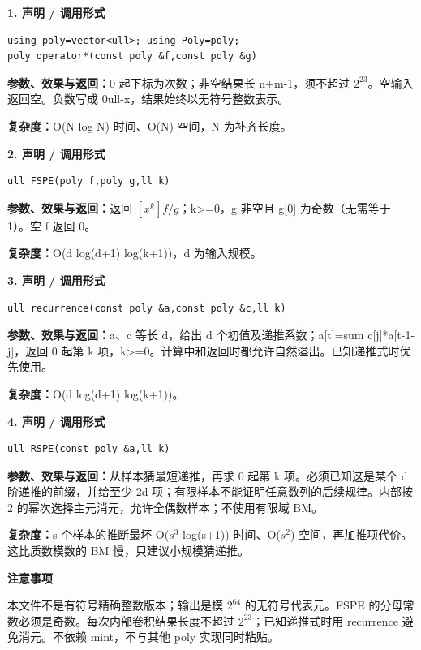 \documentclass[UTF8,a4paper,10pt]{ctexart}
\newcommand{\TemplNote}[1]{\textbf{注意事项}\par #1\par}
\begin{document}
\noindent\begin{minipage}{\textwidth}
\textbf{1. 声明 / 调用形式}
\begin{lstlisting}
using poly=vector<ull>; using Poly=poly;
poly operator*(const poly &f,const poly &g)
\end{lstlisting}
\textbf{参数、效果与返回：}0 起下标为次数；非空结果长 n+m-1，须不超过 $2^{23}$。空输入返回空。负数写成 0ull-x，结果始终以无符号整数表示。

\textbf{复杂度：}O(N log N) 时间、O(N) 空间，N 为补齐长度。

\end{minipage}\par\vspace{0.4em}
\noindent\begin{minipage}{\textwidth}
\textbf{2. 声明 / 调用形式}
\begin{lstlisting}
ull FSPE(poly f,poly g,ll k)
\end{lstlisting}
\textbf{参数、效果与返回：}返回 $[x^k]f/g$；k>=0，g 非空且 g[0] 为奇数（无需等于 1）。空 f 返回 0。

\textbf{复杂度：}O(d log(d+1) log(k+1))，d 为输入规模。

\end{minipage}\par\vspace{0.4em}
\noindent\begin{minipage}{\textwidth}
\textbf{3. 声明 / 调用形式}
\begin{lstlisting}
ull recurrence(const poly &a,const poly &c,ll k)
\end{lstlisting}
\textbf{参数、效果与返回：}a、c 等长 d，给出 d 个初值及递推系数；a[t]=sum c[j]*a[t-1-j]，返回 0 起第 k 项，k>=0。计算中和返回时都允许自然溢出。已知递推式时优先使用。

\textbf{复杂度：}O(d log(d+1) log(k+1))。

\end{minipage}\par\vspace{0.4em}
\noindent\begin{minipage}{\textwidth}
\textbf{4. 声明 / 调用形式}
\begin{lstlisting}
ull RSPE(const poly &a,ll k)
\end{lstlisting}
\textbf{参数、效果与返回：}从样本猜最短递推，再求 0 起第 k 项。必须已知这是某个 d 阶递推的前缀，并给至少 2d 项；有限样本不能证明任意数列的后续规律。内部按 2 的幂次选择主元消元，允许全偶数样本；不使用有限域 BM。

\textbf{复杂度：}s 个样本的推断最坏 O($s^3$ log(s+1)) 时间、O($s^2$) 空间，再加推项代价。这比质数模数的 BM 慢，只建议小规模猜递推。

\end{minipage}\par\vspace{0.4em}
\TemplNote{本文件不是有符号精确整数版本；输出是模 $2^{64}$ 的无符号代表元。FSPE 的分母常数必须是奇数。每次内部卷积结果长度不超过 $2^{23}$；已知递推式时用 recurrence 避免消元。不依赖 mint，不与其他 poly 实现同时粘贴。}
\clearpage
\end{document}
